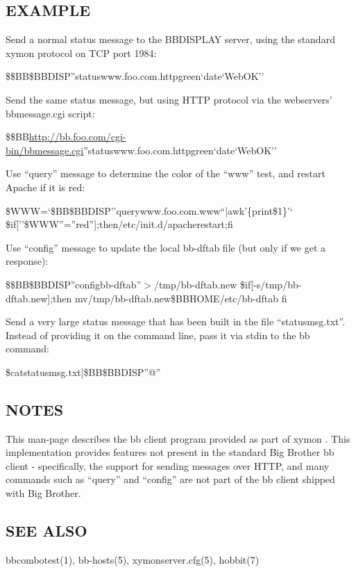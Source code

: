\subsection{EXAMPLE}


 Send a normal status message to the BBDISPLAY server, using the
 standard xymon protocol on TCP port 1984:  

 
\$\$BB\$BBDISP''statuswww.foo.com.httpgreen`date`WebOK'' 


  Send the same status message, but using HTTP protocol via the webservers' bbmessage.cgi script:  
 
\$\$BB\url{http://bb.foo.com/cgi-bin/bbmessage.cgi}''statuswww.foo.com.httpgreen`date`WebOK'' 


  Use ``query'' message to determine the color of the ``www'' test, and restart Apache if it is red:  



\$WWW=`\$BB\$BBDISP''querywww.foo.com.www``|awk'\{print\$1\}'`  \$if[''\$WWW''=''red''];then/etc/init.d/apacherestart;fi 


  Use ``config'' message to update the local bb-dftab file (but only if we get a response):  


  
\$\$BB\$BBDISP''configbb-dftab''$>$/tmp/bb-dftab.new  
\$if[-s/tmp/bb-dftab.new];then  
mv/tmp/bb-dftab.new\$BBHOME/etc/bb-dftab  
fi 


  Send a very large status message that has been built in the file
  ``statusmsg.txt''. Instead of providing it on the command line, pass
  it via stdin to the bb command: 



  
\$catstatusmsg.txt|\$BB\$BBDISP''@'' 


 
\subsection{NOTES}
 This man-page describes the bb client program provided as part of
 xymon . This implementation provides features not present in the
 standard Big Brother bb client - specifically, the support for
 sending messages over HTTP, and many commands such as ``query'' and
 ``config'' are not part of the bb client shipped with Big Brother. 


 
\subsection{SEE ALSO}

bbcombotest(1), bb-hosts(5), xymonserver.cfg(5), hobbit(7) 
  

